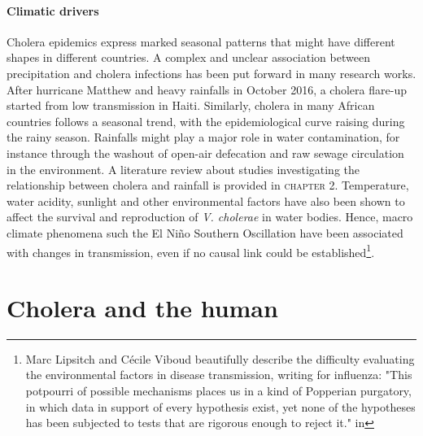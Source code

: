 \paragraph{Climatic drivers} Cholera epidemics express marked seasonal patterns that might have different shapes in different countries. A complex and unclear association between precipitation and cholera infections has been put forward in many research works. 
After hurricane Matthew and heavy rainfalls in October 2016, a cholera flare-up started from low transmission in Haiti\cite{Pasetto:RealtimeForecastingCholera:2018}. Similarly, cholera in many African countries follows a seasonal trend, with the epidemiological curve raising during the rainy season\cite{Baracchini:SeasonalityCholeraDynamics:2017}.  Rainfalls might play a major role in water contamination, for instance through the washout of open-air defecation and raw sewage circulation in the environment. A literature review about studies investigating the relationship between cholera and rainfall is provided in \textsc{chapter 2}. Temperature, water acidity, sunlight and other environmental factors have also been shown to affect the survival and reproduction of \textit{V. cholerae} in water bodies. Hence, macro climate phenomena such the El Niño Southern Oscillation have been associated with changes in transmission, even if no causal link could be established\cite[-2\baselineskip]{Pascual:CholeraDynamicsNinoSouthern:2000}\footnote{Marc Lipsitch and Cécile Viboud beautifully describe the difficulty evaluating the environmental factors in disease transmission, writing for influenza: "This potpourri of possible mechanisms places us in a kind of Popperian purgatory, in which data in support of every hypothesis exist, yet none of the hypotheses has been subjected to tests that are rigorous enough to reject it." in }.

\section{Cholera and the human} 
